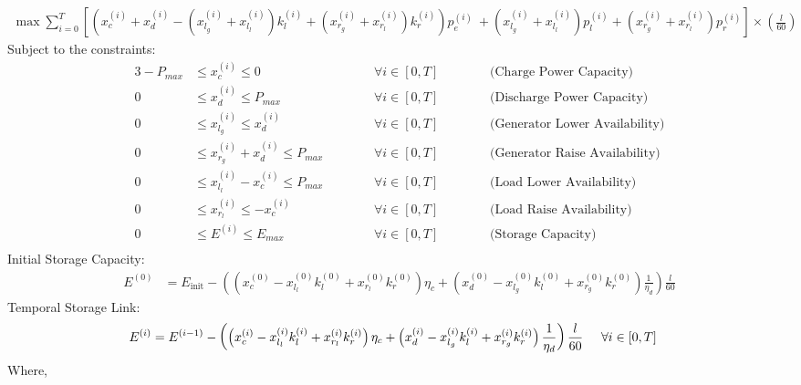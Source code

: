 \begin{align*}
  \max \sum_{i=0}^T 
   \left[  \left(x^{(i)}_c + x^{(i)}_d - (x^{(i)}_{l_g} + x^{(i)}_{l_l}) k^{(i)}_l + (x^{(i)}_{r_g} + x^{(i)}_{r_l}) k^{(i)}_r\right) p_{e}^{(i)} \
    + (x^{(i)}_{l_g} + x^{(i)}_{l_l}) p_{l}^{(i)} +(x^{(i)}_{r_g} + x^{(i)}_{r_l}) p_r^{(i)}  \right] \times \left( \frac{l}{60} \right)
\end{align*}
Subject to the constraints:
\begin{alignat*} {3}
    -P_{max} &\leq x^{(i)}_c \leq 0  &&\forall i \in [0,T] \hspace{1cm} &&  \text{(Charge Power Capacity)}\\
    0 &\leq x^{(i)}_d \leq P_{max}  &&\forall i \in [0,T] && \text{(Discharge Power Capacity)}\\
    0 &\leq x^{(i)}_{l_g} \leq x^{(i)}_d  &&\forall i \in [0,T] && \text{(Generator Lower Availability)}\\
    0 &\leq x^{(i)}_{r_g} + x^{(i)}_d\leq  P_{max} \hspace{1cm} &&\forall i \in [0,T] && \text{(Generator Raise Availability)}\\
    0 &\leq x^{(i)}_{l_l} -  x^{(i)}_c\leq P_{max}  &&\forall i \in [0,T] && \text{(Load Lower Availability)}\\
    0 &\leq x^{(i)}_{r_l}  \leq -x^{(i)}_c  &&\forall i \in [0,T] && \text{(Load Raise Availability)}\\
    0 &\leq E^{(i)} \leq E_{max} &&\forall i \in [0,T] && \text{(Storage Capacity)} \\
\end{alignat*}
Initial Storage Capacity:
\begin{align*}
    E^{(0)} &= E_{\text{init}} - 
     \left( 
        \left(x^{(0)}_c - x^{(0)}_{l_l} k^{(0)}_l + x^{(0)}_{r_l} k^{(0)}_r   \right) \eta_c + 
        \left(x^{(0)}_d - x^{(0)}_{l_g} k^{(0)}_l + x^{(0)}_{r_g} k^{(0)}_r\right) \frac{1}{\eta_d} 
    \right)
   \frac{l}{60}
\end{align*}
Temporal Storage Link:
\begin{align*}
E^{(i)} &= E^{(i-1)} - 
     \left( 
        \left(x^{(i)}_c - x^{(i)}_{l_l} k^{(i)}_l + x^{(i)}_{r_l} k^{(i)}_r   \right) \eta_c + 
        \left(x^{(i)}_d - x^{(i)}_{l_g} k^{(i)}_l + x^{(i)}_{r_g} k^{(i)}_r\right) \frac{1}{\eta_d} 
    \right)
   \frac{l}{60} \hspace{0.5cm} \forall i \in [0,T]
\end{align*}
Where,
{\renewcommand{\arraystretch}{2}}
